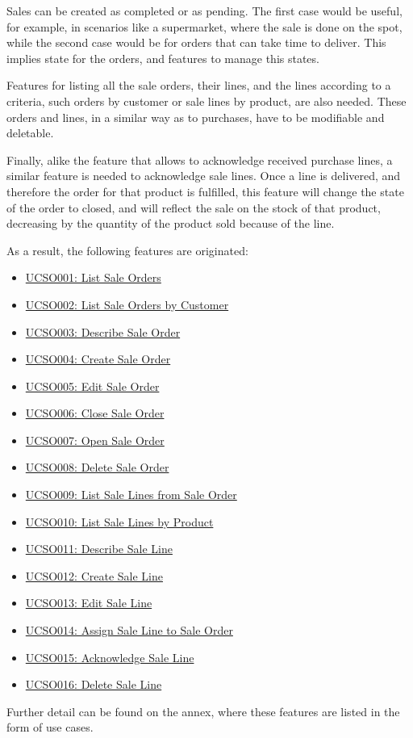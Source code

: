 Sales can be created as completed or as pending. The first case would be useful, for example, in scenarios like a supermarket, where the sale is done on the spot, while the second case would be for orders that can take time to deliver. This implies state for the orders, and features to manage this states.

Features for listing all the sale orders, their lines, and the lines according to a criteria, such orders by customer or sale lines by product, are also needed. These orders and lines, in a similar way as to purchases, have to be modifiable and deletable.

Finally, alike the feature that allows to acknowledge received purchase lines, a similar feature is needed to acknowledge sale lines. Once a line is delivered, and therefore the order for that product is fulfilled, this feature will change the state of the order to closed, and will reflect the sale on the stock of that product, decreasing by the quantity of the product sold because of the line.

As a result, the following features are originated:
\hfill\break
\begin{itemize}
\item \hyperref[UCSO001]{UCSO001: List Sale Orders}
\item \hyperref[UCSO002]{UCSO002: List Sale Orders by Customer}
\item \hyperref[UCSO003]{UCSO003: Describe Sale Order}
\item \hyperref[UCSO004]{UCSO004: Create Sale Order}
\item \hyperref[UCSO005]{UCSO005: Edit Sale Order}
\item \hyperref[UCSO006]{UCSO006: Close Sale Order}
\item \hyperref[UCSO007]{UCSO007: Open Sale Order}
\item \hyperref[UCSO008]{UCSO008: Delete Sale Order}
\item \hyperref[UCSO009]{UCSO009: List Sale Lines from Sale Order}
\item \hyperref[UCSO010]{UCSO010: List Sale Lines by Product}
\item \hyperref[UCSO011]{UCSO011: Describe Sale Line}
\item \hyperref[UCSO012]{UCSO012: Create Sale Line}
\item \hyperref[UCSO013]{UCSO013: Edit Sale Line}
\item \hyperref[UCSO014]{UCSO014: Assign Sale Line to Sale Order}
\item \hyperref[UCSO015]{UCSO015: Acknowledge Sale Line}
\item \hyperref[UCSO016]{UCSO016: Delete Sale Line}
\end{itemize}
\hfill\break
Further detail can be found on the annex, where these features are listed in the form of use cases.